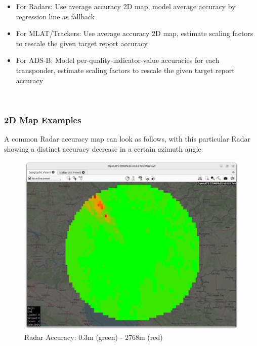 \begin{itemize}
\begin{itemize}
\item For Radars: Use average accuracy 2D map, model average accuracy by regression line as fallback
\item For MLAT/Trackers: Use average accuracy 2D map, estimate scaling factors to rescale the given target report accuracy
\item For ADS-B: Model per-quality-indicator-value accuracies for each transponder, estimate scaling factors to rescale the given target report accuracy
\end{itemize}
\ \\

\subsubsection{2D Map Examples}

A common Radar accuracy map can look as follows, with this particular Radar showing a distinct accuracy decrease in a certain azimuth angle:
\begin{figure}[H]
    \hspace*{-2.5cm}
    \includegraphics[width=19cm]{figures/radar_acc.png}
  \caption{Radar Accuracy: 0.3m (green) - 2768m (red)} 
\end{figure} 


\end{itemize}
